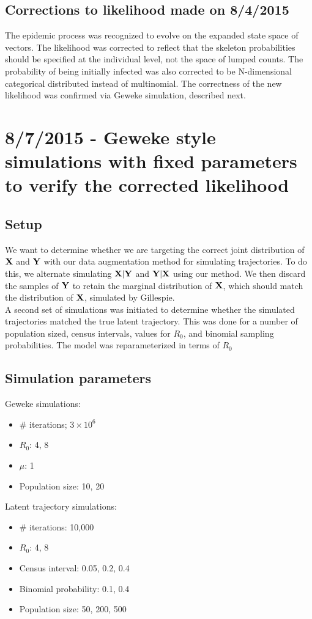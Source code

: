 \subsection*{Corrections to likelihood made on 8/4/2015}
The epidemic process was recognized to evolve on the expanded state space of vectors. The likelihood was corrected to reflect that the skeleton probabilities should be specified at the individual level, not the space of lumped counts. The probability of being initially infected was also corrected to be N-dimensional categorical distributed instead of multinomial. The correctness of the new likelihood was confirmed via Geweke simulation, described next. 
\section*{8/7/2015 - Geweke style simulations with fixed parameters to verify the corrected likelihood }
\subsection*{Setup}
We want to determine whether we are targeting the correct joint distribution of $ \mathbf{X} $ and $ \mathbf{Y} $ with our data augmentation method for simulating trajectories. To do this, we alternate simulating $ \mathbf{X} | \mathbf{Y} $ and $ \mathbf{Y} | \mathbf{X} $ using our method. We then discard the samples of $ \mathbf{Y} $ to retain the marginal distribution of $ \mathbf{X} $, which should match the distribution of $ \mathbf{X} $, simulated by Gillespie.\\

A second set of simulations was initiated to determine whether the simulated trajectories matched the true latent trajectory. This was done for a number of population sized, census intervals, values for $ R_0 $, and binomial sampling probabilities. The model was reparameterized in terms of $ R_0 $

\subsection*{Simulation parameters}
Geweke simulations:
\begin{itemize}
	\item \# iterations; $ 3\times 10^6 $
	\item $ R_0 $: 4, 8
	\item $ \mu $: 1
	\item Population size: 10, 20
\end{itemize}

Latent trajectory simulations:
\begin{itemize}
	\item \# iterations: 10,000
	\item $ R_0 $: 4, 8
	\item Census interval: 0.05, 0.2, 0.4
	\item Binomial probability: 0.1, 0.4
	\item Population size: 50, 200, 500
\end{itemize}

